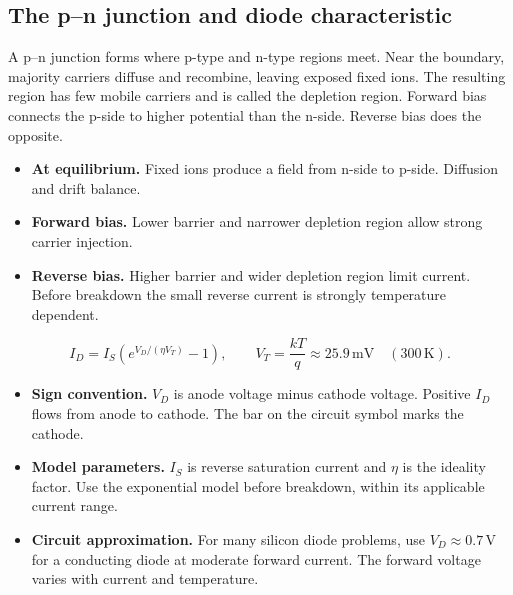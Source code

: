 \documentclass[12pt,a4paper]{article}
\begin{document}
\subsection{The p--n junction and diode characteristic}
\begin{tcolorbox}[defbox,title={Depletion region and bias}]
A p--n junction forms where p-type and n-type regions meet. Near the boundary, majority carriers diffuse and recombine, leaving exposed fixed ions. The resulting region has few mobile carriers and is called the depletion region. Forward bias connects the p-side to higher potential than the n-side. Reverse bias does the opposite.
\end{tcolorbox}

\begin{itemize}[leftmargin=*, itemsep=3pt, topsep=4pt]
  \item \textbf{At equilibrium.} Fixed ions produce a field from n-side to p-side. Diffusion and drift balance.
  \item \textbf{Forward bias.} Lower barrier and narrower depletion region allow strong carrier injection.
  \item \textbf{Reverse bias.} Higher barrier and wider depletion region limit current. Before breakdown the small reverse current is strongly temperature dependent.
\end{itemize}
\[
I_D=I_S\left(e^{V_D/(\eta V_T)}-1\right),\qquad V_T=\frac{kT}{q}\approx25.9\,\mathrm{mV}\quad(300\,\mathrm K).
\]
\begin{itemize}[leftmargin=*, itemsep=3pt, topsep=4pt]
  \item \textbf{Sign convention.} \(V_D\) is anode voltage minus cathode voltage. Positive \(I_D\) flows from anode to cathode. The bar on the circuit symbol marks the cathode.
  \item \textbf{Model parameters.} \(I_S\) is reverse saturation current and \(\eta\) is the ideality factor. Use the exponential model before breakdown, within its applicable current range.
  \item \textbf{Circuit approximation.} For many silicon diode problems, use \(V_D\approx0.7\,\mathrm V\) for a conducting diode at moderate forward current. The forward voltage varies with current and temperature.
\end{itemize}
\end{document}
